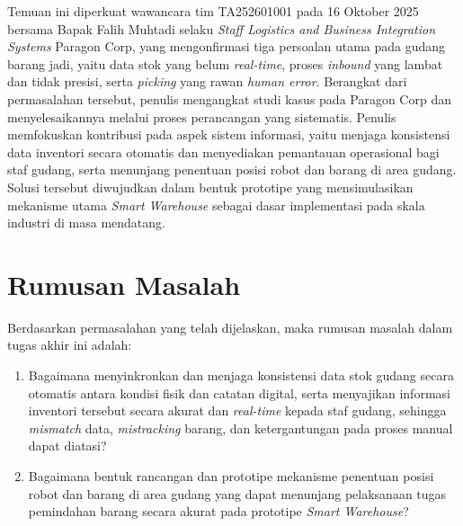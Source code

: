 Temuan ini diperkuat wawancara tim TA252601001 pada 16 Oktober 2025 bersama Bapak Falih Muhtadi selaku \textit{Staff Logistics and Business Integration Systems} Paragon Corp, yang mengonfirmasi tiga persoalan utama pada gudang barang jadi, yaitu data stok yang belum \textit{real-time}, proses \textit{inbound} yang lambat dan tidak presisi, serta \textit{picking} yang rawan \textit{human error}. Berangkat dari permasalahan tersebut, penulis mengangkat studi kasus pada Paragon Corp dan menyelesaikannya melalui proses perancangan yang sistematis. Penulis memfokuskan kontribusi pada aspek sistem informasi, yaitu menjaga konsistensi data inventori secara otomatis dan menyediakan pemantauan operasional bagi staf gudang, serta menunjang penentuan posisi robot dan barang di area gudang. Solusi tersebut diwujudkan dalam bentuk prototipe yang mensimulasikan mekanisme utama \textit{Smart Warehouse} sebagai dasar implementasi pada skala industri di masa mendatang.

\section{Rumusan Masalah}
Berdasarkan permasalahan yang telah dijelaskan, maka rumusan masalah dalam tugas akhir ini adalah:
\begin{enumerate}
\item Bagaimana menyinkronkan dan menjaga konsistensi data stok gudang secara otomatis antara kondisi fisik dan catatan digital, serta menyajikan informasi inventori tersebut secara akurat dan \textit{real-time} kepada staf gudang, sehingga \textit{mismatch} data, \textit{mistracking} barang, dan ketergantungan pada proses manual dapat diatasi?
\item Bagaimana bentuk rancangan dan prototipe mekanisme penentuan posisi robot dan barang di area gudang yang dapat menunjang pelaksanaan tugas pemindahan barang secara akurat pada prototipe \textit{Smart Warehouse}?
\end{enumerate}

